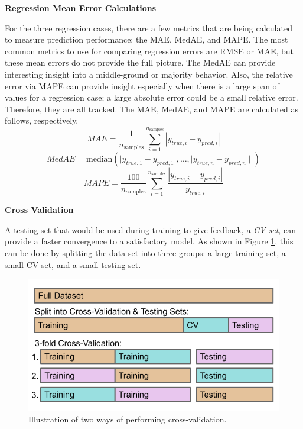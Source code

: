 \noindent \textbf{Regression Mean Error Calculations}

For the three regression cases, there are a few metrics that are being
calculated to measure prediction performance: the \gls{MAE}, \gls{MedAE}, and
\gls{MAPE}. The most common metrics to use for comparing regression errors are
\gls{RMSE} or \gls{MAE}, but these mean errors do not provide the full picture.
The \gls{MedAE} can provide interesting insight into a middle-ground or
majority behavior. Also, the relative error via \gls{MAPE} can provide insight
especially when there is a large span of values for a regression case; a large
absolute error could be a small relative error. Therefore, they are all
tracked.  The \gls{MAE}, \gls{MedAE}, and \gls{MAPE} are calculated as follows,
respectively.
\begin{equation}
  \textit{MAE} = \frac{1}{n_{\text{samples}}} \sum_{i=1}^{n_{\text{samples}}} 
                 \left| y_{true, i} - y_{pred, i} \right|
\end{equation}
\begin{equation}
  \textit{MedAE} = \text{median}(\mid y_{true, 1} - y_{pred, 1} \mid, \ldots, 
                                 \mid y_{true, n} - y_{pred, n} \mid)
\end{equation}
\begin{equation}
  \textit{MAPE} =  \frac{100}{n_{\text{samples}}} \sum_{i=1}^{n_{\text{samples}}} 
                   \frac{\left| y_{true, i} - y_{pred, i} \right|}{y_{true, i}}
\end{equation}

\noindent \textbf{Cross Validation}

A testing set that would be used during training to give feedback, a
\textit{\gls{CV} set}, can provide a faster convergence to a satisfactory
model. As shown in Figure \ref{fig:cverror}, this can be done by splitting the
data set into three groups: a large training set, a small \gls{CV} set, and a
small testing set.  

\begin{figure}[!htb]
  \centering
  \includegraphics[width=0.85\linewidth]{./chapters/litrev/cverror.png}
  \caption{Illustration of two ways of performing cross-validation.}
  \label{fig:cverror}
\end{figure}


